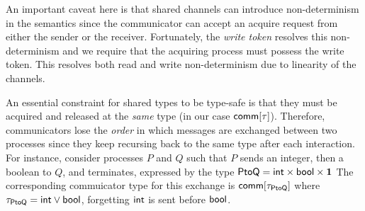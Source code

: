 
An important caveat here is that shared channels can introduce non-determinism
in the semantics since the communicator can accept an acquire request from
either the sender or the receiver.
Fortunately, the \emph{write token} resolves this non-determinism and we require that
the acquiring process must possess the write token.
This resolves both read and write non-determinism due to linearity of the channels.

An essential constraint for shared types to be type-safe is that they must be acquired
and released at the \emph{same} type (in our case $\mathsf{comm}[\tau]$).
Therefore, communicators lose the \emph{order} in which messages are exchanged
between two processes since they keep recursing back to the same type after each interaction.
For instance, consider processes $P$ and $Q$ such that $P$ sends an integer, then a boolean to $Q$,
and terminates, expressed by the type $\mathsf{PtoQ} = \mathsf{int} \times \mathsf{bool} \times \mathbf{1}$
The corresponding commuicator type for this exchange is $\mathsf{comm[\tau_{\mathsf{PtoQ}}]}$
where $\tau_{\mathsf{PtoQ}} = \mathsf{int} \lor \mathsf{bool}$, forgetting $\mathsf{int}$ is sent
before $\mathsf{bool}$.

